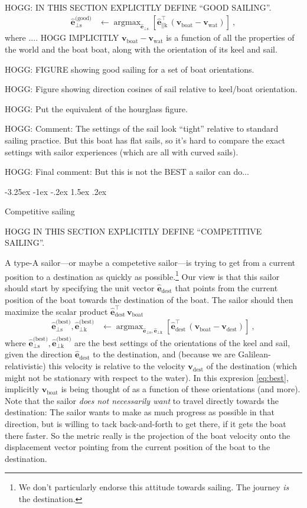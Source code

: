 \documentclass{article}
\makeatletter
\DeclareMathOperator*{\argmax}{argmax}
\renewcommand{\vec}[1]{\boldsymbol{#1}}
\newcommand{\uvec}{\vec{\hat{e}}}
\newcommand{\water}{\text{wat}}
\newcommand{\boat}{\text{boat}}
\newcommand{\destination}{\text{dest}}
\newcommand{\good}{\text{(good)}}
\newcommand{\best}{\text{(best)}}
\newcommand{\sail}{\text{s}}
\newcommand{\keel}{\text{k}}
\newcommand{\vwater}{\vec{v}_\water}
\newcommand{\vboat}{\vec{v}_\boat}
\newcommand{\vdest}{\vec{v}_\destination}
\renewcommand\section{\@startsection {section}{1}{\z@}%
  {-3.25ex \@plus -1ex \@minus -.2ex}%
  {1.5ex \@plus .2ex}%
  {\raggedright\normalfont\large\bfseries}}
\makeatother
\begin{document}
HOGG: IN THIS SECTION EXPLICITLY DEFINE ``GOOD SAILING''.
\begin{align}\label{eq:good}
    \uvec_{\perp\sail}^\good &\leftarrow \argmax_{\uvec_{\perp\sail}} \left[\uvec_{\parallel\keel}^\top\,(\vboat-\vwater)\right] ~,
\end{align}
where .... HOGG IMPLICITLY $\vboat-\vwater$ is a function of all the properties of the world and the boat boat, along with the orientation of its keel and sail.

HOGG: FIGURE showing good sailing for a set of boat orientations.

HOGG: Figure showing direction cosines of sail relative to keel/boat orientation.

HOGG: Put the equivalent of the hourglass figure.

HOGG: Comment: The settings of the sail look ``tight'' relative to standard sailing practice. But this boat has flat sails, so it's hard to compare the exact settings with sailor experiences (which are all with curved sails).

HOGG: Final comment: But this is not the BEST a sailor can do...

\section{Competitive sailing}\label{sec:racing}

HOGG IN THIS SECTION EXPLICITLY DEFINE ``COMPETITIVE SAILING''.

A type-A sailor---or maybe a competetive sailor---is trying to get from a current position to a destination as quickly as possible.\footnote{We don't particularly endorse this attitude towards sailing. The journey \emph{is} the destination.}
Our view is that this sailor should start by specifying the unit vector $\uvec_\destination$ that points from the current position of the boat towards the destination of the boat.
The sailor should then maximize the scalar product $\uvec_\destination^\top\,\vboat$
\begin{align}\label{eq:best}
    \uvec_{\perp\sail}^\best,\uvec_{\perp\keel}^\best &\leftarrow \argmax_{\uvec_{\perp\sail},\uvec_{\perp\keel}} \left[\uvec_\destination^\top\,(\vboat-\vdest)\right] ~,
\end{align}
where $\uvec_{\perp\sail}^\best,\uvec_{\perp\keel}^\best$ are the best settings of the orientations of the keel and sail, given the direction $\uvec_\destination$ to the destination, and (because we are Galilean-relativistic) this velocity is relative to the velocity $\vdest$ of the destination (which might not be stationary with respect to the water).
In this expresion \eqref{eq:best}, implicitly $\vboat$ is being thought of as a function of these orientations (and more).
Note that the sailor \emph{does not necessarily want} to travel directly towards the destination:
The sailor wants to make as much progress as possible in that direction, but is willing to tack back-and-forth to get there, if it gets the boat there faster.
So the metric really is the projection of the boat velocity onto the displacement vector pointing from the current position of the boat to the destination.
\end{document}
